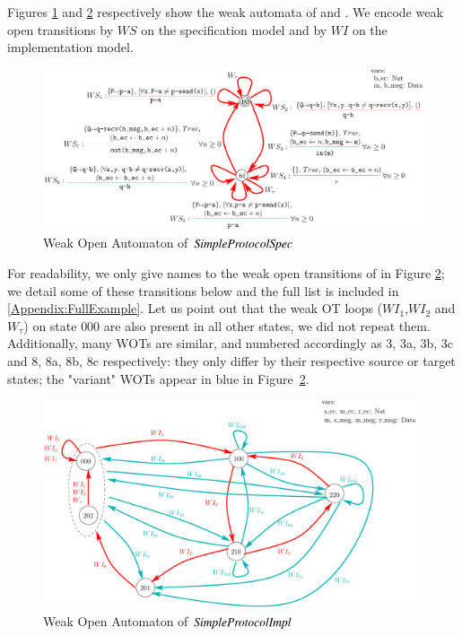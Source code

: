 \documentclass{elsarticle}
\begin{document}
  \begin{example}
    Figures \ref{SimpleProtCounter:WeakSpecOA} and \ref{SimpleProtCounter:ImplWOA2} respectively show the weak automata of  and . We encode weak open transitions  by $WS$ on the specification model and by $WI$ on the implementation model.
    



\begin{figure}[h]
   \centerline{\includegraphics[width=\linewidth]{XFIG/SPSpecWeakOpen}}
  \caption{Weak Open Automaton of  $\symb{SimpleProtocolSpec}$}
   \label{SimpleProtCounter:WeakSpecOA}
\end{figure}

 For readability, we only give names to the  weak open transitions of  in Figure \ref{SimpleProtCounter:ImplWOA2}; we detail some of these transitions below and the full list is included in  \ref{Appendix:FullExample}.
Let us point out that the weak OT loops ($WI_1$,$WI_2$ and $W_\tau$) on state ${000}$ are also present in all other states, we did not repeat them. Additionally, many WOTs are similar, and numbered accordingly as 3, 3a, 3b, 3c and 8, 8a, 8b, 8c respectively: they only differ by their respective source or target states; the "variant" WOTs appear in blue in   Figure~\ref{SimpleProtCounter:ImplWOA2}.
\end{example}




\begin{figure}[h]
   \centerline{\includegraphics[width=11cm]{XFIG/SimpleProtImpl-WOA2}}
  \caption{Weak Open Automaton of $\symb{SimpleProtocolImpl}$}
   \label{SimpleProtCounter:ImplWOA2}
\end{figure}
\end{document}
